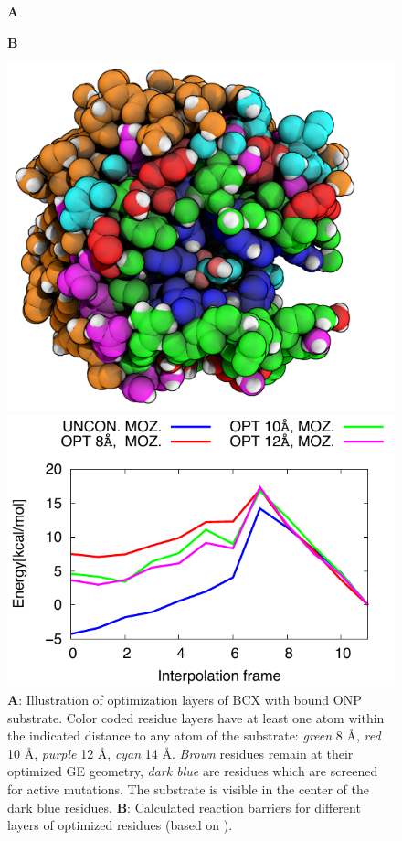 \begin{figure}[htbp] 
\centering
\begin{minipage}{0.42\linewidth}
\textbf{A}
\end{minipage}
\begin{minipage}{0.42\linewidth}
\textbf{B}
\end{minipage}
\begin{minipage}{0.47\linewidth}
\includegraphics[width=0.95\linewidth]{bcx-constraint-layers-ray-occlusion-2.png}
\end{minipage}
\begin{minipage}{0.51\linewidth}
\includegraphics[width=1.00\linewidth]{bcx-barriers-constraint-layers.pdf}
\end{minipage}
\caption{
\textbf{A}: Illustration of optimization layers of BCX with bound ONP substrate.
Color coded residue layers have at least one atom within the indicated distance to any atom of the substrate:
\textit{green} 8 \AA, \textit{red} 10 \AA, \textit{purple} 12 \AA, \textit{cyan} 14 \AA.
\textit{Brown} residues remain at their optimized GE geometry, \textit{dark blue} are residues which are screened for active mutations.
The substrate is visible in the center of the dark blue residues.
\textbf{B}: Calculated reaction barriers for different layers of optimized residues (based on \cite{hediger2013computational}).
}
\label{fig:bcx_constr_constraint_layers}
\end{figure}
